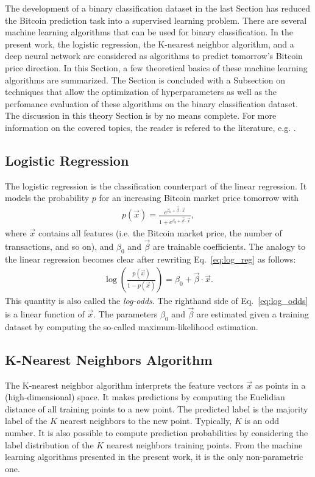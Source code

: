 The development of a binary classification dataset in the last Section has reduced the Bitcoin prediction task into a supervised learning problem. There are several machine learning algorithms that can be used for binary classification. In the present work, the logistic regression, the K-nearest neighbor algorithm, and a deep neural network are considered as algorithms to predict tomorrow's Bitcoin price direction. In this Section, a few theoretical basics of these machine learning algorithms are summarized. The Section is concluded with a Subsection on techniques that allow the optimization of hyperparameters as well as the perfomance evaluation of these algorithms on the binary classification dataset. The discussion in this theory Section is by no means complete. For more information on the covered topics, the reader is refered to the literature, e.g. \cite{stat_2014}.

\subsection{Logistic Regression}
The logistic regression is the classification counterpart of the linear regression. It models the probability $p$ for an increasing Bitcoin market price tomorrow with
\begin{align}\label{eq:log_reg}
	p(\vec{x}) = \frac{e^{\beta_0 + \vec{\beta} \cdot \vec{x}}}{1 + e^{\beta_0 + \vec{\beta} \cdot \vec{x}}},
\end{align}
where $\vec{x}$ contains all features (i.e. the Bitcoin market price, the number of transactions, and so on), and $\beta_0$ and $\vec{\beta}$ are trainable coefficients. The analogy to the linear regression becomes clear after rewriting Eq.~\ref{eq:log_reg} as follows:
\begin{align}\label{eq:log_odds}
	\log \left(\frac{p(\vec{x})}{1 - p(\vec{x})} \right) = \beta_0 + \vec{\beta} \cdot \vec{x}.
\end{align}
This quantity is also called the \textit{log-odds}. The righthand side of Eq.~\ref{eq:log_odds} is a linear function of $\vec{x}$. The parameters $\beta_0$ and $\vec{\beta}$ are estimated given a training dataset by computing the so-called maximum-likelihood estimation.	

\subsection{K-Nearest Neighbors Algorithm}
The K-nearest neighbor algorithm interprets the feature vectors $\vec{x}$ as points in a (high-dimensional) space. It makes predictions by computing the Euclidian distance of all training points to a new point. The predicted label is the majority label of the $K$ nearest neighbors to the new point. Typically, $K$ is an odd number. It is also possible to compute prediction probabilities by considering the label distribution of the $K$ nearest neighbors training points. From the machine learning algorithms presented in the present work, it is the only non-parametric one.

